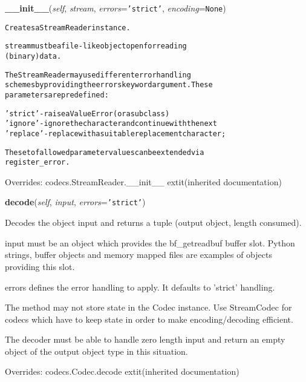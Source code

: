 \hspace{.8\funcindent}\begin{boxedminipage}{\funcwidth}

    \raggedright \textbf{\_\_init\_\_}(\textit{self}, \textit{stream}, \textit{errors}={\tt \texttt{'}\texttt{strict}\texttt{'}}, \textit{encoding}={\tt None})

\setlength{\parskip}{2ex}
\begin{alltt}
Creates a StreamReader instance.

stream must be a file-like object open for reading
(binary) data.

The StreamReader may use different error handling
schemes by providing the errors keyword argument. These
parameters are predefined:

 'strict' - raise a ValueError (or a subclass)
 'ignore' - ignore the character and continue with the next
 'replace'- replace with a suitable replacement character;

The set of allowed parameter values can be extended via
register\_error.
\end{alltt}

\setlength{\parskip}{1ex}
      Overrides: codecs.StreamReader.\_\_init\_\_ 	extit{(inherited documentation)}

    \end{boxedminipage}

    \vspace{0.5ex}

\hspace{.8\funcindent}\begin{boxedminipage}{\funcwidth}

    \raggedright \textbf{decode}(\textit{self}, \textit{input}, \textit{errors}={\tt \texttt{'}\texttt{strict}\texttt{'}})

\setlength{\parskip}{2ex}
    Decodes the object input and returns a tuple (output object, length 
    consumed).

    input must be an object which provides the bf\_getreadbuf buffer slot. 
    Python strings, buffer objects and memory mapped files are examples of 
    objects providing this slot.

    errors defines the error handling to apply. It defaults to 'strict' 
    handling.

    The method may not store state in the Codec instance. Use StreamCodec 
    for codecs which have to keep state in order to make encoding/decoding 
    efficient.

    The decoder must be able to handle zero length input and return an 
    empty object of the output object type in this situation.

\setlength{\parskip}{1ex}
      Overrides: codecs.Codec.decode 	extit{(inherited documentation)}

    \end{boxedminipage}



